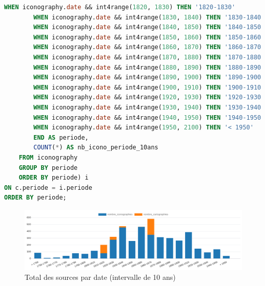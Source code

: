 \begin{lstlisting}[language=SQL, caption=Requête SQL pour nombre de sources par date (10 ans)]
        WHEN iconography.date && int4range(1820, 1830) THEN '1820-1830' 
        WHEN iconography.date && int4range(1830, 1840) THEN '1830-1840' 
        WHEN iconography.date && int4range(1840, 1850) THEN '1840-1850' 
        WHEN iconography.date && int4range(1850, 1860) THEN '1850-1860' 
        WHEN iconography.date && int4range(1860, 1870) THEN '1860-1870' 
        WHEN iconography.date && int4range(1870, 1880) THEN '1870-1880' 
        WHEN iconography.date && int4range(1880, 1890) THEN '1880-1890' 
        WHEN iconography.date && int4range(1890, 1900) THEN '1890-1900' 
        WHEN iconography.date && int4range(1900, 1910) THEN '1900-1910' 
        WHEN iconography.date && int4range(1920, 1930) THEN '1920-1930' 
        WHEN iconography.date && int4range(1930, 1940) THEN '1930-1940' 
        WHEN iconography.date && int4range(1940, 1950) THEN '1940-1950' 
        WHEN iconography.date && int4range(1950, 2100) THEN '< 1950' 
        END AS periode, 
        COUNT(*) AS nb_icono_periode_10ans
    FROM iconography 
    GROUP BY periode 
    ORDER BY periode) i
ON c.periode = i.periode
ORDER BY periode; \end{lstlisting}

\begin{figure}[h!]
    \centering
    \includegraphics[width=1\linewidth]{images/graphiques/total_source_date_10.png}
    \caption{Total des sources par date (intervalle de 10 ans)}
    \label{fig:total_sources_date10}
\end{figure}